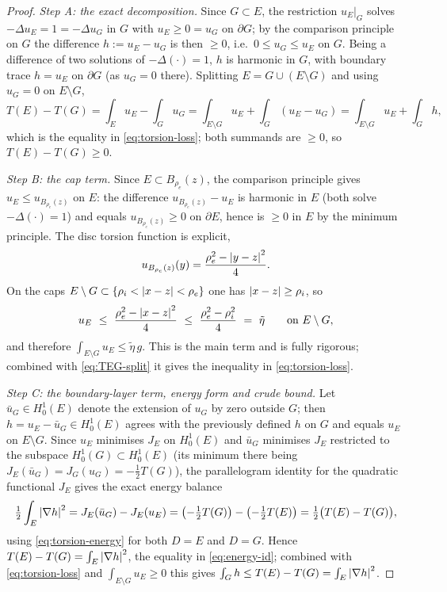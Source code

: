 \begin{proof}
\emph{Step A: the exact decomposition.}
Since $G\subset E$, the restriction $u_E|_G$ solves $-\Delta u_E=1=-\Delta
u_G$ in $G$ with $u_E\ge0=u_G$ on $\partial G$; by the comparison principle
on $G$ the difference $h:=u_E-u_G$ is then $\ge0$, i.e.\ $0\le u_G\le u_E$ on
$G$. Being a difference of two solutions of $-\Delta(\cdot)=1$, $h$ is
harmonic in $G$, with boundary trace $h=u_E$ on $\partial G$ (as $u_G=0$
there). Splitting $E=G\cup(E\setminus G)$ and using $u_G=0$ on $E\setminus G$,
\begin{equation}\label{eq:TEG-split}
   T(E)-T(G)=\int_E u_E-\int_G u_G
   =\int_{E\setminus G}u_E+\int_G(u_E-u_G)
   =\int_{E\setminus G}u_E+\int_G h,
\end{equation}
which is the equality in \eqref{eq:torsion-loss}; both summands are
$\ge0$, so $T(E)-T(G)\ge0$.

\emph{Step B: the cap term.}
Since $E\subset B_{\rho_e}(z)$, the comparison principle gives $u_E\le
u_{B_{\rho_e}(z)}$ on $E$: the difference $u_{B_{\rho_e}(z)}-u_E$ is harmonic
in $E$ (both solve $-\Delta(\cdot)=1$) and equals $u_{B_{\rho_e}(z)}\ge0$ on
$\partial E$, hence is $\ge0$ in $E$ by the minimum principle. The disc
torsion function is explicit,
\begin{equation}\label{eq:discu}
   u_{B_{\rho_e}(z)}(y)=\frac{\rho_e^2-\left\lvert y-z\right\rvert^2}{4}.
\end{equation}
On the caps $E\setminus G\subset\{\rho_i<\left\lvert x-z\right\rvert<\rho_e\}$ one has
$\left\lvert x-z\right\rvert\ge\rho_i$, so
\begin{equation}\label{eq:barrier}
   u_E\ \le\ \frac{\rho_e^2-\left\lvert x-z\right\rvert^2}{4}
   \ \le\ \frac{\rho_e^2-\rho_i^2}{4}\ =\ \tilde\eta
   \qquad\text{on } E\setminus G,
\end{equation}
and therefore $\int_{E\setminus G}u_E\le\tilde\eta\,g$. This is the main
term and is fully rigorous; combined with \eqref{eq:TEG-split} it gives the
inequality in \eqref{eq:torsion-loss}.

\emph{Step C: the boundary-layer term, energy form and crude bound.}
Let $\bar u_G\in H^1_0(E)$ denote the extension of $u_G$ by zero outside $G$;
then $h=u_E-\bar u_G\in H^1_0(E)$ agrees with the previously defined $h$ on
$G$ and equals $u_E$ on $E\setminus G$. Since $u_E$ minimises $J_E$ on
$H^1_0(E)$ and $\bar u_G$ minimises $J_E$ restricted to the subspace
$H^1_0(G)\subset H^1_0(E)$ (its minimum there being $J_E(\bar
u_G)=J_G(u_G)=-\tfrac12T(G)$), the parallelogram identity for the quadratic
functional $J_E$ gives the exact energy balance
\begin{equation}\label{eq:energy-balance}
   \tfrac12\int_E\left\lvert\nabla h\right\rvert^2
   =J_E(\bar u_G)-J_E(u_E)
   =\bigl(-\tfrac12T(G)\bigr)-\bigl(-\tfrac12T(E)\bigr)
   =\tfrac12\bigl(T(E)-T(G)\bigr),
\end{equation}
using \eqref{eq:torsion-energy} for both $D=E$ and $D=G$. Hence
$T(E)-T(G)=\int_E\left\lvert\nabla h\right\rvert^2$, the equality in \eqref{eq:energy-id};
combined with \eqref{eq:torsion-loss} and $\int_{E\setminus G}u_E\ge0$ this
gives $\int_G h\le T(E)-T(G)=\int_E\left\lvert\nabla h\right\rvert^2$.


\end{proof}
